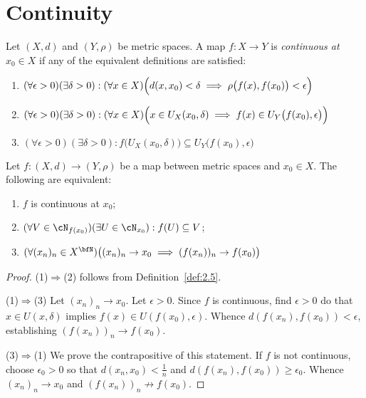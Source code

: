 \section{Continuity}
    \begin{definition}\label{def:2.5}
        Let $(X,d)$ and $(Y,\rho)$ be metric spaces. A map $f:X \rightarrow Y$ is \textit{continuous at $x_0 \in X$} if any of the equivalent definitions are satisfied:
            \begin{enumerate}[label = (\arabic*),itemsep=1pt,topsep=3pt]
                \item $(\forall \epsilon > 0)(\exists \delta > 0):(\forall x \in X)\Bigl(d(x,x_0) < \delta \implies \rho\bigl(f(x),f(x_0)\bigr) < \epsilon\Bigr)$
                \item $(\forall \epsilon > 0)(\exists \delta > 0):(\forall x \in X)\Bigl(x \in U_X(x_0, \delta) \implies f(x) \in U_Y\bigl(f(x_0),\epsilon\bigr)\Bigr)$
                \item $(\forall \epsilon > 0)(\exists \delta > 0):f\bigl(U_X(x_0,\delta)\bigr) \subseteq U_Y\bigl(f(x_0),\epsilon\bigr)$
            \end{enumerate}
    \end{definition}

    \begin{proposition}
        Let $f:(X,d) \rightarrow (Y,\rho)$ be a map between metric spaces and $x_0 \in X$. The following are equivalent:
            \begin{enumerate}[label = (\arabic*),itemsep=1pt,topsep=3pt]
                \item $f$ is continuous at $x_0$;
                \item $(\forall V \in \cN_{f(x_0)})(\exists U \in \cN_{x_0}):f(U) \subseteq V$;
                \item $(\forall (x_n)_n \in X^\bfN)\bigl((x_n)_n \rightarrow x_0 \implies (f(x_n))_n \rightarrow f(x_0)\bigr)$
            \end{enumerate}
    \end{proposition}
        \begin{proof}
            (1)$\Rightarrow$(2) follows from Definition~\ref{def:2.5}. 
            
            (1)$\Rightarrow$(3) Let $(x_n)_n \rightarrow x_0$. Let $\epsilon > 0$. Since $f$ is continuous, find $\epsilon > 0$ do that $x \in U(x,\delta)$ implies $f(x) \in U(f(x_0),\epsilon)$. Whence $d(f(x_n),f(x_0)) < \epsilon$, establishing $(f(x_n))_n \rightarrow f(x_0)$.

            (3)$\Rightarrow$(1) We prove the contrapositive of this statement. If $f$ is not continuous, choose $\epsilon_0>0$ so that $d(x_n,x_0) < \frac{1}{n}$ and $d(f(x_n),f(x_0)) \geq \epsilon_0$. Whence $(x_n)_n \rightarrow x_0$ and $(f(x_n))_n \not\rightarrow f(x_0)$.
        \end{proof}

